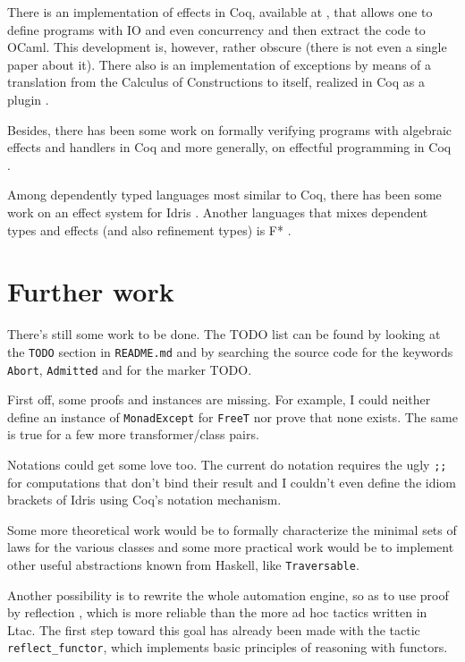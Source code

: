 \documentclass[declaration,inz,english,shortabstract]{iithesis}
\newcommand{\m}[1]{\texttt{#1}}
\begin{document}
There is an implementation of effects in Coq, available at \cite{CoqIO}, that allows one to define programs with IO and even concurrency and then extract the code to OCaml. This development is, however, rather obscure (there is not even a single paper about it). There also is an implementation of exceptions by means of a translation from the Calculus of Constructions to itself, realized in Coq as a plugin \cite{FailureIsNotAnOption}.

Besides, there has been some work on formally verifying programs with algebraic effects and handlers in Coq \cite{CoqEff1} \cite{CoqEff2} and more generally, on effectful programming in Coq \cite{CoqEff3}.

Among dependently typed languages most similar to Coq, there has been some work on an effect system for Idris \cite{IdrisEffects}. Another languages that mixes dependent types and effects (and also refinement types) is F* \cite{FStar}.

\section{Further work}

There's still some work to be done. The TODO list can be found by looking at the \m{TODO} section in \m{README.md} and by searching the source code for the keywords \m{Abort}, \m{Admitted} and for the marker TODO.

First off, some proofs and instances are missing. For example, I could neither define an instance of \m{MonadExcept} for \m{FreeT} nor prove that none exists. The same is true for a few more transformer/class pairs.

Notations could get some love too. The current do notation requires the ugly \m{;;} for computations that don't bind their result and I couldn't even define the idiom brackets of Idris using Coq's notation mechanism.

Some more theoretical work would be to formally characterize the minimal sets of laws for the various classes and some more practical work would be to implement other useful abstractions known from Haskell, like \m{Traversable}.

Another possibility is to rewrite the whole automation engine, so as to use proof by reflection \cite{CPDT}, which is more reliable than the more ad hoc tactics written in Ltac. The first step toward this goal has already been made with the tactic \m{reflect\_functor}, which implements basic principles of reasoning with functors.
\end{document}
